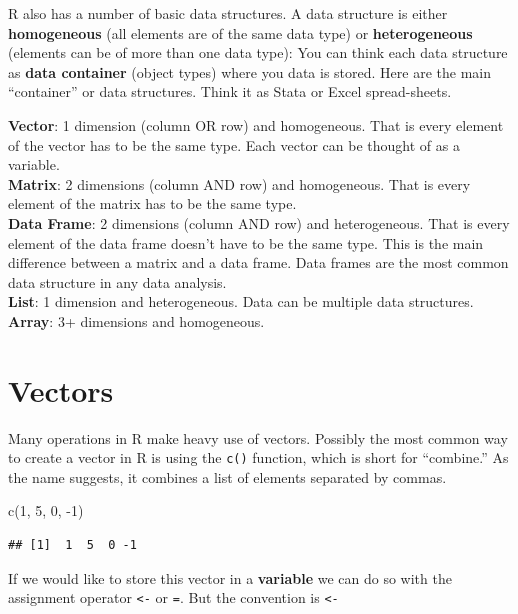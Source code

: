 \documentclass[
]{book}
\newenvironment{Shaded}{\begin{snugshade}}{\end{snugshade}}
\newcommand{\DecValTok}[1]{\textcolor[rgb]{0.00,0.00,0.81}{#1}}
\newcommand{\FunctionTok}[1]{\textcolor[rgb]{0.00,0.00,0.00}{#1}}
\newcommand{\NormalTok}[1]{#1}
\newcommand{\SpecialCharTok}[1]{\textcolor[rgb]{0.00,0.00,0.00}{#1}}
\theoremstyle{definition}
\theoremstyle{definition}
\theoremstyle{definition}
\theoremstyle{definition}
\theoremstyle{remark}
\begin{document}
R also has a number of basic data structures. A data structure is either \textbf{homogeneous} (all elements are of the same data type) or \textbf{heterogeneous} (elements can be of more than one data type): You can think each data structure as \textbf{data container} (object types) where you data is stored. Here are the main ``container'' or data structures. Think it as Stata or Excel spread-sheets.

\textbf{Vector}: 1 dimension (column OR row) and homogeneous. That is every element of the vector has to be the same type. Each vector can be thought of as a variable.\\
\textbf{Matrix}: 2 dimensions (column AND row) and homogeneous. That is every element of the matrix has to be the same type.\\
\textbf{Data Frame}: 2 dimensions (column AND row) and heterogeneous. That is every element of the data frame doesn't have to be the same type. This is the main difference between a matrix and a data frame. Data frames are the most common data structure in any data analysis.\\
\textbf{List}: 1 dimension and heterogeneous. Data can be multiple data structures.\\
\textbf{Array}: 3+ dimensions and homogeneous.

\hypertarget{vectors}{%
\chapter{Vectors}\label{vectors}}

Many operations in R make heavy use of vectors. Possibly the most common way to create a vector in R is using the \texttt{c()} function, which is short for ``combine.'' As the name suggests, it combines a list of elements separated by commas.

\begin{Shaded}
\begin{Highlighting}[]
\FunctionTok{c}\NormalTok{(}\DecValTok{1}\NormalTok{, }\DecValTok{5}\NormalTok{, }\DecValTok{0}\NormalTok{, }\SpecialCharTok{{-}}\DecValTok{1}\NormalTok{)}
\end{Highlighting}
\end{Shaded}

\begin{verbatim}
## [1]  1  5  0 -1
\end{verbatim}

If we would like to store this vector in a \textbf{variable} we can do so with the assignment operator \texttt{\textless{}-} or \texttt{=}. But the convention is \texttt{\textless{}-}
\end{document}
